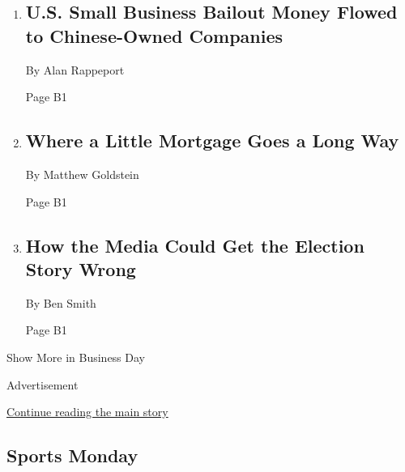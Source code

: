 \begin{enumerate}
\def\labelenumi{\arabic{enumi}.}
\item
  \href{/2020/08/02/us/politics/virus-china-ppp-small-business-loans.html}{}

  \hypertarget{us-small-business-bailout-money-flowed-to-chinese-owned-companies}{%
  \subsection{U.S. Small Business Bailout Money Flowed to Chinese-Owned
  Companies}\label{us-small-business-bailout-money-flowed-to-chinese-owned-companies}}

  By Alan Rappeport

  Page B1
\item
  \href{/2020/08/02/business/mortgages-affordable-housing.html}{}

  \hypertarget{where-a-little-mortgage-goes-a-long-way-1}{%
  \subsection{Where a Little Mortgage Goes a Long
  Way}\label{where-a-little-mortgage-goes-a-long-way-1}}

  By Matthew Goldstein

  Page B1
\item
  \href{/2020/08/02/business/media/election-coverage.html}{}

  \hypertarget{how-the-media-could-get-the-election-story-wrong}{%
  \subsection{How the Media Could Get the Election Story
  Wrong}\label{how-the-media-could-get-the-election-story-wrong}}

  By Ben Smith

  Page B1
\end{enumerate}

Show More in Business Day

Advertisement

\protect\hyperlink{after-mid4}{Continue reading the main story}

\hypertarget{sports-monday}{%
\subsection{Sports Monday}\label{sports-monday}}

